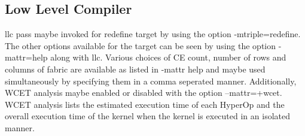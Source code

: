 \documentclass[12pt]{article}
\begin{document}
\subsection{Low Level Compiler}
llc pass maybe invoked for redefine target by using the option -mtriple=redefine. The other options available for the target can be seen by using the option -mattr=help along with llc. Various choices of CE count, number of rows and columns of fabric are available as listed in -mattr help and maybe used simultaneously by specifying them in a comma seperated manner. Additionally, WCET analysis maybe enabled or disabled with the option --mattr=+wcet. WCET analysis lists the estimated execution time of each HyperOp and the overall execution time of the kernel when the kernel is executed in an isolated manner.
\end{document}
